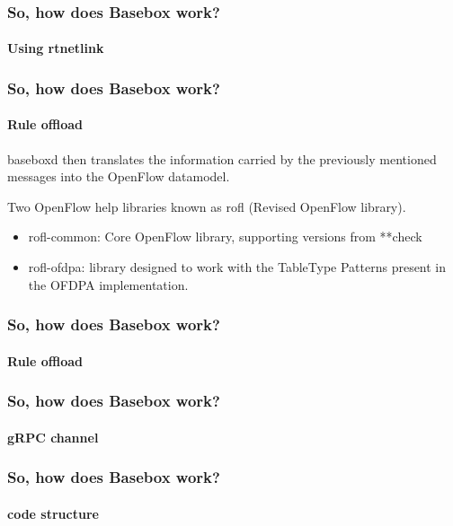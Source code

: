 \documentclass[11pt]{beamer}
\begin{document}
\begin{frame}
\frametitle{So, how does Basebox work?}
\framesubtitle{Using rtnetlink}



\end{frame}

\begin{frame}
\frametitle{So, how does Basebox work?}
\framesubtitle{Rule offload}

baseboxd then translates the information carried by the previously mentioned messages into the OpenFlow datamodel. 

Two OpenFlow help libraries known as rofl (Revised OpenFlow library).
\begin{itemize}
\item rofl-common: Core OpenFlow library, supporting versions from **check
\item rofl-ofdpa: library designed to work with the TableType Patterns present in the OFDPA implementation.
\end{itemize}
\end{frame}

\begin{frame}
\frametitle{So, how does Basebox work?}
\framesubtitle{Rule offload}


\end{frame}

\begin{frame}
\frametitle{So, how does Basebox work?}
\framesubtitle{gRPC channel}


\end{frame}

\begin{frame}
\frametitle{So, how does Basebox work?}
\framesubtitle{code structure}


\end{frame}
\end{document}
